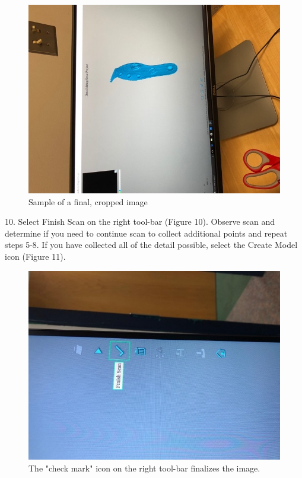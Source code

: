 \begin{figure}[!htp]
\centering
\includegraphics[scale=.75, angle=270]{3D_Cropped}
\caption{Sample of a final, cropped image}
\label{img:Finish2}
\end{figure}

\newpage

10. Select Finish Scan on the right tool-bar (Figure 10). Observe scan and determine if you need to continue scan to collect additional points and repeat steps 5-8. If you have collected all of the detail possible, select the Create Model icon (Figure 11).

\begin{figure}[!htp]
\centering
\includegraphics[scale=.75, angle=270]{3D_Finalize}
\caption{The "check mark" icon on the right tool-bar finalizes the image.}
\label{Image 10}
\end{figure}


